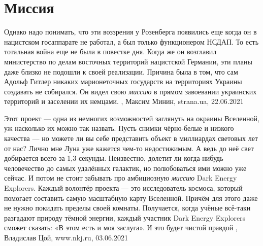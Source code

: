  
 
 
 
 
\chapter{Миссия}

Однако надо понимать, что эти воззрения у Розенберга появились еще когда он в
нацистском госаппарате не работал, а был только функционером НСДАП. То есть
тотальная война еще не была в повестке дня. Когда же он возглавил министерство
по делам восточных территорий нацистской Германии, эти планы даже близко не
подошли к своей реализации.  Причина была в том, что сам Адольф Гитлер никаких
марионеточных государств на территориях Украины создавать не собирался. Он
видел свою \emph{миссию} в прямом завоевании украинских территорий и заселении их
немцами. 
, 
Максим Минин, strana.ua, 22.06.2021

Этот проект — одна из немногих возможностей заглянуть на окраины Вселенной, уж
насколько их можно так назвать. Пусть снимки чёрно-белые и низкого качества —
но можете ли вы себе представить объект в миллиардах световых лет от нас? Лично
мне Луна уже кажется чем-то недостижимым. А ведь до неё свет добирается всего
за 1,3 секунды. Неизвестно, долетит ли когда-нибудь человечество до самых
удалённых галактик, но полюбоваться ими можно уже сейчас.  И потом не стоит
забывать про амбициозную \emph{миссию} Dark Energy Explorers. Каждый волонтёр проекта
— это исследователь космоса, который помогает составить самую масштабную карту
Вселенной. Причём для этого даже не нужно покидать пределы своей комнаты.
Получается, когда учёные всё-таки разгадают природу тёмной энергии, каждый
участник Dark Energy Explorers сможет сказать: «В этом есть и моя заслуга». И
это будет чистой правдой
, 
Владислав Цой, www.nkj.ru, 03.06.2021

